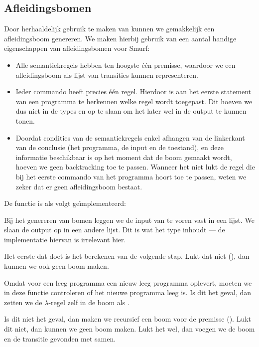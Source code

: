 \subsection{Afleidingsbomen}
Door herhaaldelijk gebruik te maken van  kunnen we gemakkelijk een
afleidingsboom genereren. We maken hierbij gebruik van een aantal handige
eigenschappen van afleidingsbomen voor Smurf:

\begin{itemize}
	\item Alle semantiekregels hebben ten hoogste één premisse, waardoor we een
		afleidingsboom als lijst van transities kunnen representeren.
	\item Ieder commando heeft precies één regel. Hierdoor is aan het eerste
		statement van een programma te herkennen welke regel wordt toegepast. Dit
		hoeven we dus niet in de types  en  op te
		slaan om het later wel in de output te kunnen tonen.
	\item Doordat condities van de semantiekregels enkel afhangen van de
		linkerkant van de conclusie (het programma, de input en de toestand), en
		deze informatie beschikbaar is op het moment dat de boom gemaakt wordt,
		hoeven we geen backtracking toe te passen. Wanneer het niet lukt de regel
		die bij het eerste commando van het programma hoort toe te passen, weten we
		zeker dat er geen afleidingsboom bestaat.
\end{itemize}

De functie  is als volgt geïmplementeerd:



Bij het genereren van bomen leggen we de input van te voren vast in een lijst.
We slaan de output op in een andere lijst. Dit is wat het type 
inhoudt --- de implementatie hiervan is irrelevant hier.

Het eerste dat  doet is het berekenen van de volgende stap. Lukt dat
niet (), dan kunnen we ook geen boom maken.

Omdat  voor een leeg programma een nieuw leeg programma oplevert,
moeten we in deze functie controleren of het nieuwe programma leeg is. Is dit
het geval, dan zetten we de $\lambda$-regel zelf in de boom als .

Is dit niet het geval, dan maken we recursief een boom voor de premisse
(). Lukt dit niet, dan kunnen we geen boom maken. Lukt
het wel, dan voegen we de boom en de transitie gevonden met  samen.
